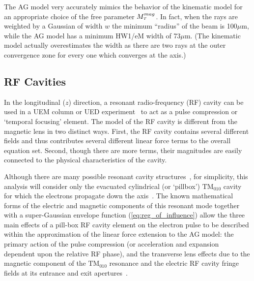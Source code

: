 The AG model very accurately mimics the behavior of the kinematic model for an appropriate choice of the free parameter $M_{{\scriptscriptstyle T}}^{mag}$.
In fact, when the rays are weighted by a Gaussian of width $w$ the minimum ``radius'' of the beam is 100$\mu$m, while the AG model has a minimum HW1/eM width of 73$\mu$m.
(The kinematic model actually overestimates the width as there are two rays at the outer convergence zone for every one which converges at the axis.) 

\subsection{RF Cavities} \label{rf_cav_model}

In the longitudinal ($ z $) direction, a resonant radio-frequency (RF) cavity can be used in a UEM column or UED experiment~\cite{oudheusden_electron_2007,fill_sub-fs_2006} to act as a pulse compression or `temporal focusing' element.
The model of the RF cavity is different from the magnetic lens in two distinct ways.
First, the RF cavity contains several different fields and thus contributes several different linear force terms to the overall equation set.
Second, though there are more terms, their magnitudes are easily connected to the physical characteristics of the cavity.

Although there are many possible resonant cavity structures~\cite{oudheusden_electron_2007,humphries_principles_1986}, for simplicity, this analysis will consider only the evacuated cylindrical (or `pillbox') $\text{TM}_{010}$ cavity for which the electrons propagate down the axis~\cite{fill_sub-fs_2006,humphries_principles_1986}.
The known mathematical forms of the electric and magnetic components of this resonant mode together with a super-Gaussian envelope function (\ref{eq:reg_of_influence}) allow the three main effects of a pill-box RF cavity element on the electron pulse to be described within the approximation of the linear force extension to the AG model: the primary action of the pulse compression (or acceleration and expansion dependent upon the relative RF phase), and the transverse lens effects due to the magnetic component of the $\text{TM}_{010}$ resonance and the electric RF cavity fringe fields at its entrance and exit apertures~\cite{kim_rf_1989}.

